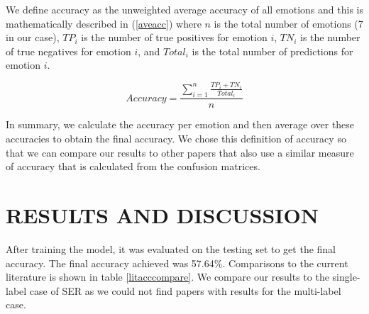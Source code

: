 \documentclass[a4paper, 10pt, conference]{ieeeconf}      %
\begin{document}
We define accuracy as the unweighted average accuracy of all emotions and this is mathematically described in (\ref{aveacc}) where $n$ is the total number of emotions (7 in our case), $TP_{i}$ is the number of true positives for emotion $i$, $TN_{i}$ is the number of true negatives for emotion $i$, and $Total_{i}$ is the total number of predictions for emotion $i$.

\begin{equation}
	\label{aveacc}
	Accuracy = \frac{\sum_{i=1}^{n}\frac{TP_{i} + TN_{i}}{Total_{i}}}{n}
\end{equation}

In summary, we calculate the accuracy per emotion and then average over these accuracies to obtain the final accuracy. We chose this definition of accuracy so that we can compare our results to other papers that also use a similar measure of accuracy that is calculated from the confusion matrices.

\addtolength{\textheight}{-3cm}   %


\section{RESULTS AND DISCUSSION}

After training the model, it was evaluated on the testing set to get the final accuracy. The final accuracy achieved was 57.64\%. Comparisons to the current literature is shown in table \ref{litacccompare}. We compare our results to the single-label case of SER as we could not find papers with results for the multi-label case.
\end{document}
